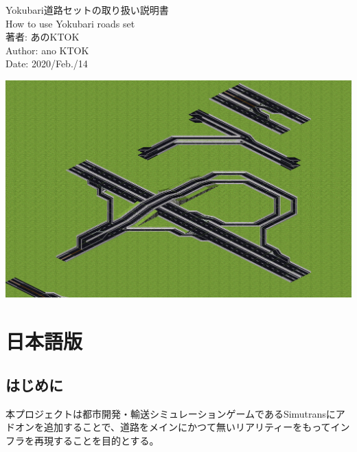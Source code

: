 \documentclass{jarticle}
\begin{document}
\thispagestyle{empty}

\begin{flushleft}

  { \fontsize{24pt}{0pt}\selectfont
    Yokubari道路セットの取り扱い説明書
  }
	\\
\vspace{3pt}
	{ \fontsize{12pt}{0pt}\selectfont
		How to use Yokubari roads set
	}
	\\
\vspace{15pt}
	{ \fontsize{18pt}{0pt}\selectfont
		著者: あのKTOK
	}
	\\
\vspace{2pt}
	{ \fontsize{12pt}{0pt}\selectfont
		Author: ano KTOK
	}
	\\
\vspace{15pt}
	{ \fontsize{12pt}{0pt}\selectfont
		Date: 2020/Feb./14
	}
\end{flushleft}

\vspace{15pt}
\begin{flushleft}
  \includegraphics[width = 15cm]{picture/20210207app1.png}
\end{flushleft}


\newpage

\renewcommand{\contentsname}{目次 / Index}
\tableofcontents

\newpage

\section{日本語版}

\subsection{はじめに}
本プロジェクトは都市開発・輸送シミュレーションゲームであるSimutransにアドオンを追加することで、道路をメインにかつて無いリアリティーをもってインフラを再現することを目的とする。
\end{document}
